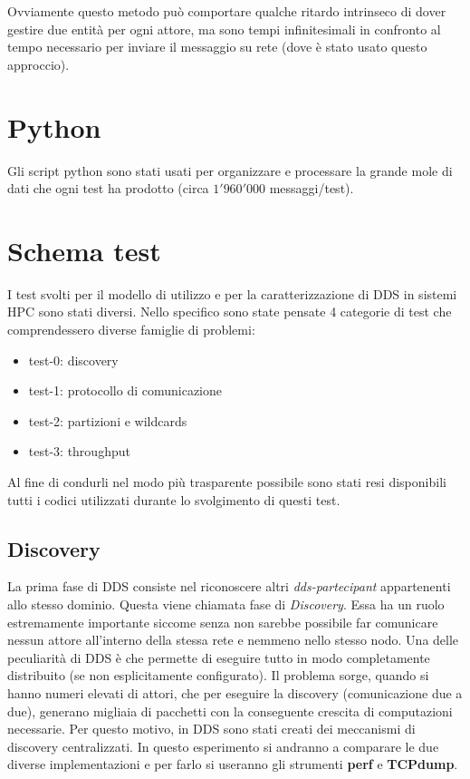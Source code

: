 Ovviamente questo metodo può comportare qualche ritardo intrinseco di dover gestire due entità per ogni attore, ma sono tempi infinitesimali in confronto al tempo necessario per inviare il messaggio su rete (dove è stato usato questo approccio).

\section{Python}
Gli script python sono stati usati per organizzare e processare la grande mole di dati che ogni test ha prodotto (circa $1'960'000$ messaggi/test). 


\section{Schema test}
I test svolti per il modello di utilizzo e per la caratterizzazione di DDS in sistemi HPC sono stati diversi. Nello specifico sono state pensate 4 categorie di test che comprendessero diverse famiglie di problemi:

\begin{itemize}
    \item test-0: discovery
    \item test-1: protocollo di comunicazione
    \item test-2: partizioni e wildcards
    \item test-3: throughput
\end{itemize}

Al fine di condurli nel modo più trasparente possibile sono stati resi disponibili~\cite{mygit} tutti i codici utilizzati durante lo svolgimento di questi test. %


\subsection{Discovery}
La prima fase di DDS consiste nel riconoscere altri \emph{dds-partecipant} appartenenti allo stesso dominio. Questa viene chiamata fase di \emph{ Discovery}. Essa ha un ruolo estremamente importante siccome senza non sarebbe possibile far comunicare nessun attore all'interno della stessa rete e nemmeno nello stesso nodo. Una delle peculiarità di DDS è che permette di eseguire tutto in modo completamente distribuito (se non esplicitamente configurato). Il problema sorge, quando si hanno numeri elevati di attori, che per eseguire la discovery (comunicazione due a due), generano migliaia di pacchetti con la conseguente crescita di  computazioni necessarie. %
Per questo motivo, in DDS sono stati creati dei meccanismi di discovery centralizzati. In questo esperimento si andranno a comparare le due diverse implementazioni e per farlo si useranno gli strumenti \textbf{perf} e \textbf{TCPdump}.

